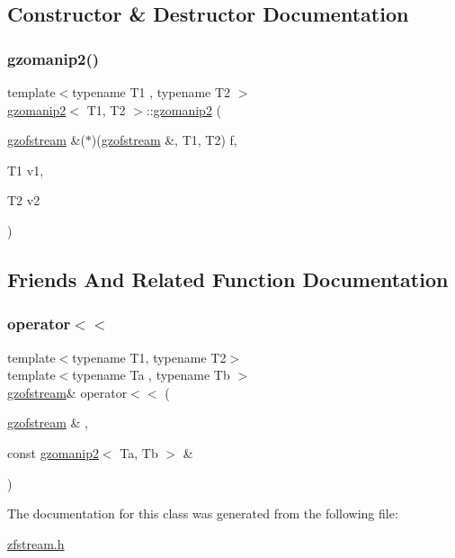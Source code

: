 \subsection{Constructor \& Destructor Documentation}
\mbox{\label{classgzomanip2_a6e3980ce2fa39e29ecfa537bb8e9ddb0}} 
\subsubsection{\texorpdfstring{gzomanip2()}{gzomanip2()}}
{\footnotesize\ttfamily template$<$typename T1 , typename T2 $>$ \\
\hyperlink{classgzomanip2}{gzomanip2}$<$ T1, T2 $>$\+::\hyperlink{classgzomanip2}{gzomanip2} (\begin{DoxyParamCaption}\item[{\hyperlink{classgzofstream}{gzofstream} \&($\ast$)(\hyperlink{classgzofstream}{gzofstream} \&, T1, T2)}]{f,  }\item[{T1}]{v1,  }\item[{T2}]{v2 }\end{DoxyParamCaption})\hspace{0.3cm}{\ttfamily [inline]}}



\subsection{Friends And Related Function Documentation}
\mbox{\label{classgzomanip2_a2382d2b86b2af773d17c2bc349fddb4f}} 
\subsubsection{\texorpdfstring{operator$<$$<$}{operator<<}}
{\footnotesize\ttfamily template$<$typename T1, typename T2$>$ \\
template$<$typename Ta , typename Tb $>$ \\
\hyperlink{classgzofstream}{gzofstream}\& operator$<$$<$ (\begin{DoxyParamCaption}\item[{\hyperlink{classgzofstream}{gzofstream} \&}]{,  }\item[{const \hyperlink{classgzomanip2}{gzomanip2}$<$ Ta, Tb $>$ \&}]{ }\end{DoxyParamCaption})\hspace{0.3cm}{\ttfamily [friend]}}



The documentation for this class was generated from the following file\+:\begin{DoxyCompactItemize}
\item 
\hyperlink{zfstream_8h}{zfstream.\+h}\end{DoxyCompactItemize}
